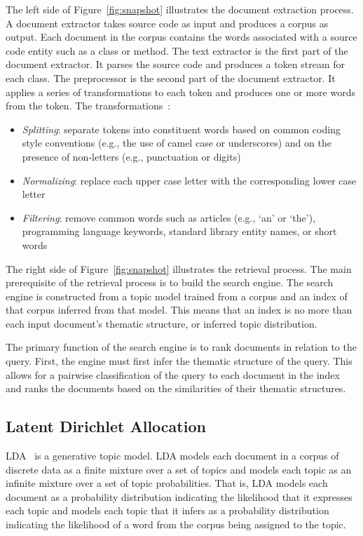 The left side of Figure~\ref{fig:snapshot} illustrates the document extraction
process.  A document extractor takes source code as input and produces a corpus
as output.  Each document in the corpus contains the words associated with
a source code entity such as a class or method.  The text extractor is the first
part of the document extractor.  It parses the source code and produces a token
stream for each class.  The preprocessor is the second part of the document
extractor.  It applies a series of transformations to each token and produces
one or more words from the token.
The transformations~\cite{Marcus-etal:2004,Marcus-Menzies:2010}: %
\begin{itemize}
    \item {\it Splitting}: separate tokens into constituent words based on
        common coding style conventions (e.g., the use of camel case or
        underscores) and on the presence of non-letters (e.g., punctuation or
        digits)
    \item {\it Normalizing}: replace each upper case letter with the
        corresponding lower case letter
    \item {\it Filtering}: remove common words such as articles (e.g., `an' or
        `the'), programming language keywords, standard library entity names, or
        short words
\end{itemize}

The right side of Figure~\ref{fig:snapshot} illustrates the retrieval process.
The main prerequisite of the retrieval process is to build the search engine.
The search engine is constructed from a topic model trained from a corpus and an
index of that corpus inferred from that model.
This means that an index is no more than each input document's thematic
structure, or inferred topic distribution.

The primary function of the search engine is to rank documents in relation to
the query.  First, the engine must first infer the thematic structure of the
query.  This allows for a pairwise classification of the query to each document
in the index and ranks the documents based on the similarities of their thematic
structures.

\subsection{Latent Dirichlet Allocation}

LDA~\cite{Blei-etal:2003} is a generative topic model.
LDA models each document in a corpus of discrete data as a finite mixture over
a set of topics and models each topic as an infinite mixture over a set of
topic probabilities.  That is, LDA models each document as a probability
distribution indicating the likelihood that it expresses each topic and models
each topic that it infers as a probability distribution indicating the
likelihood of a word from the corpus being assigned to the topic.

